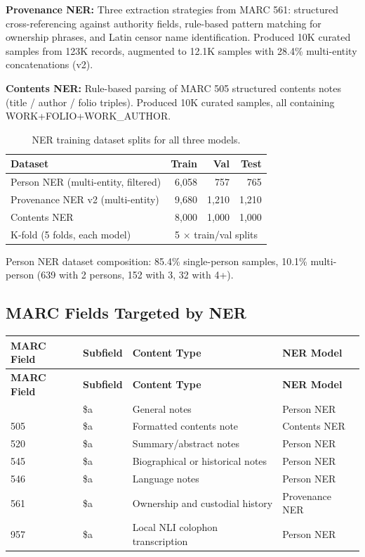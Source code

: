 \documentclass[12pt]{article}
\begin{document}
\textbf{Provenance NER:} Three extraction strategies from MARC 561: structured cross-referencing against authority fields, rule-based pattern matching for ownership phrases, and Latin censor name identification. Produced 10K curated samples from 123K records, augmented to 12.1K samples with 28.4\% multi-entity concatenations (v2).

\textbf{Contents NER:} Rule-based parsing of MARC 505 structured contents notes (title / author / folio triples). Produced 10K curated samples, all containing WORK+FOLIO+WORK\_AUTHOR.

\begin{table}[H]
\centering
\begin{tabular}{lrrr}
\toprule
\textbf{Dataset} & \textbf{Train} & \textbf{Val} & \textbf{Test} \\
\midrule
Person NER (multi-entity, filtered) & 6,058 & 757 & 765 \\
Provenance NER v2 (multi-entity) & 9,680 & 1,210 & 1,210 \\
Contents NER & 8,000 & 1,000 & 1,000 \\
K-fold (5 folds, each model) & \multicolumn{3}{c}{5 $\times$ train/val splits} \\
\bottomrule
\end{tabular}
\caption{NER training dataset splits for all three models.}
\label{tab:ner-data}
\end{table}

Person NER dataset composition: 85.4\% single-person samples, 10.1\% multi-person (639 with 2 persons, 152 with 3, 32 with 4+).

\subsection{MARC Fields Targeted by NER}

\begin{longtable}{|l|l|p{5cm}|l|}
\hline
\textbf{MARC Field} & \textbf{Subfield} & \textbf{Content Type} & \textbf{NER Model} \\
\hline
\endfirsthead
\hline
\textbf{MARC Field} & \textbf{Subfield} & \textbf{Content Type} & \textbf{NER Model} \\
\hline
\endhead
\hline
\endfoot
500 & \$a & General notes & Person NER \\
\hline
505 & \$a & Formatted contents note & Contents NER \\
\hline
520 & \$a & Summary/abstract notes & Person NER \\
\hline
545 & \$a & Biographical or historical notes & Person NER \\
\hline
546 & \$a & Language notes & Person NER \\
\hline
561 & \$a & Ownership and custodial history & Provenance NER \\
\hline
957 & \$a & Local NLI colophon transcription & Person NER \\
\hline
\end{longtable}
\end{document}
